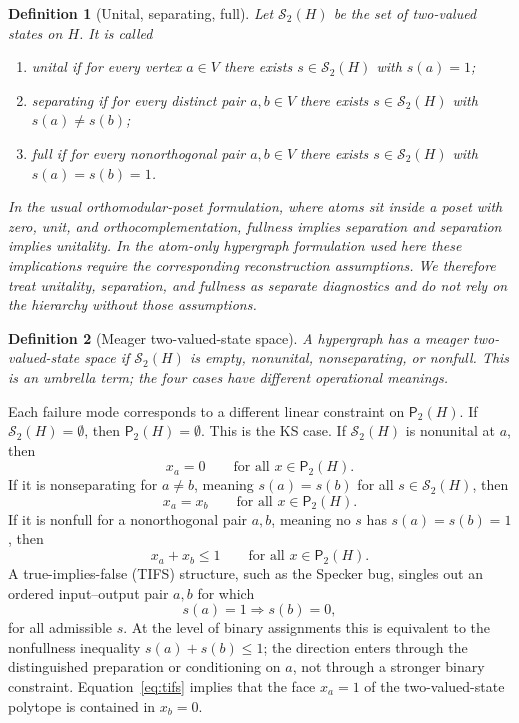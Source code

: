 \documentclass[aps,pra,twocolumn,superscriptaddress,nofootinbib]{revtex4-2}
\newtheorem{definition}{Definition}
\newcommand{\TVS}{\mathcal{S}_2}
\newcommand{\Ptwo}{\mathsf{P}_{2}}
\begin{document}
\begin{definition}[Unital, separating, full]
Let $\TVS(H)$ be the set of two-valued states on $H$.
It is called
\begin{enumerate}
\item \emph{unital} if for every vertex $a\in V$ there exists $s\in\TVS(H)$ with $s(a)=1$;
\item \emph{separating} if for every distinct pair $a,b\in V$ there exists $s\in\TVS(H)$ with $s(a)\ne s(b)$;
\item \emph{full} if for every nonorthogonal pair $a,b\in V$ there exists $s\in\TVS(H)$ with $s(a)=s(b)=1$.
\end{enumerate}
In the usual orthomodular-poset formulation, where atoms sit inside a poset with zero, unit, and orthocomplementation, fullness implies separation and separation implies unitality.  In the atom-only hypergraph formulation used here these implications require the corresponding reconstruction assumptions.  We therefore treat unitality, separation, and fullness as separate diagnostics and do not rely on the hierarchy without those assumptions.
\end{definition}

\begin{definition}[Meager two-valued-state space]
A hypergraph has a meager two-valued-state space if $\TVS(H)$ is empty, nonunital, nonseparating, or nonfull.  This is an umbrella term; the four cases have different operational meanings.
\end{definition}

Each failure mode corresponds to a different linear constraint on $\Ptwo(H)$.  If $\TVS(H)=\emptyset$, then $\Ptwo(H)=\emptyset$.  This is the KS case.  If $\TVS(H)$ is nonunital at $a$, then
\begin{equation}
        x_a=0 \qquad \text{for all }x\in\Ptwo(H).
        \label{eq:nonunital-face}
\end{equation}
If it is nonseparating for $a\ne b$, meaning $s(a)=s(b)$ for all $s\in\TVS(H)$, then
\begin{equation}
        x_a=x_b \qquad \text{for all }x\in\Ptwo(H).
        \label{eq:nonsep-face}
\end{equation}
If it is nonfull for a nonorthogonal pair $a,b$, meaning no $s$ has $s(a)=s(b)=1$, then
\begin{equation}
        x_a+x_b\le1 \qquad \text{for all }x\in\Ptwo(H).
        \label{eq:nonfull-face}
\end{equation}
A true-implies-false (TIFS) structure, such as the Specker bug, singles out an ordered input--output pair $a,b$ for which
\begin{equation}
        s(a)=1\Longrightarrow s(b)=0,
        \label{eq:tifs}
\end{equation}
for all admissible $s$.  At the level of binary assignments this is equivalent to the nonfullness inequality $s(a)+s(b)\leq1$; the direction enters through the distinguished preparation or conditioning on $a$, not through a stronger binary constraint.  Equation~\eqref{eq:tifs} implies that the face $x_a=1$ of the two-valued-state polytope is contained in $x_b=0$.
\end{document}

